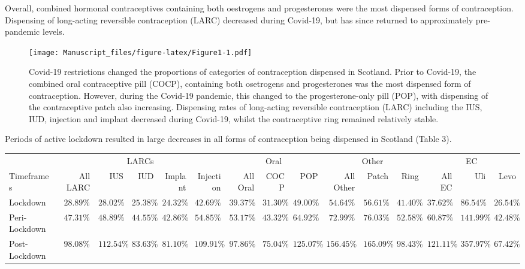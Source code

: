 \documentclass[
]{article}
\begin{document}
Overall, combined hormonal contraceptives containing both oestrogens and
progesterones were the most dispensed forms of contraception. Dispensing
of long-acting reversible contraception (LARC) decreased during
Covid-19, but has since returned to approximately pre-pandemic levels.

\begin{figure}
\centering
\texttt{[image: Manuscript\_files/figure-latex/Figure1-1.pdf]}
\caption{Covid-19 restrictions changed the proportions of categories of
contraception dispensed in Scotland. Prior to Covid-19, the combined
oral contraceptive pill (COCP), containing both osetrogens and
progesterones was the most dispensed form of contraception. However,
during the Covid-19 pandemic, this changed to the progesterone-only pill
(POP), with dispensing of the contraceptive patch also increasing.
Dispensing rates of long-acting reversible contraception (LARC)
including the IUS, IUD, injection and implant decreased during Covid-19,
whilst the contraceptive ring remained relatively stable.}
\end{figure}

Periods of active lockdown resulted in large decreases in all forms of
contraception being dispensed in Scotland (Table 3).

\begin{longtable}{lrrrrrrrrrrrrrr}
\toprule
 & \multicolumn{5}{c}{LARCs} & \multicolumn{3}{c}{Oral} & \multicolumn{3}{c}{Other} & \multicolumn{3}{c}{EC} \\ 
\cmidrule(lr){2-6} \cmidrule(lr){7-9} \cmidrule(lr){10-12} \cmidrule(lr){13-15}
Timeframes & All LARC & IUS & IUD & Implant & Injection & All Oral & COCP & POP & All Other & Patch & Ring & All EC & Uli & Levo \\ 
\midrule
Lockdown & $28.89\%$ & $28.02\%$ & $25.38\%$ & $24.32\%$ & $42.69\%$ & $39.37\%$ & $31.30\%$ & $49.00\%$ & $54.64\%$ & $56.61\%$ & $41.40\%$ & $37.62\%$ & $86.54\%$ & $26.54\%$ \\ 
Peri-Lockdown & $47.31\%$ & $48.89\%$ & $44.55\%$ & $42.86\%$ & $54.85\%$ & $53.17\%$ & $43.32\%$ & $64.92\%$ & $72.99\%$ & $76.03\%$ & $52.58\%$ & $60.87\%$ & $141.99\%$ & $42.48\%$ \\ 
Post-Lockdown & $98.08\%$ & $112.54\%$ & $83.63\%$ & $81.10\%$ & $109.91\%$ & $97.86\%$ & $75.04\%$ & $125.07\%$ & $156.45\%$ & $165.09\%$ & $98.43\%$ & $121.11\%$ & $357.97\%$ & $67.42\%$ \\ 
\bottomrule
\end{longtable}
\end{document}
